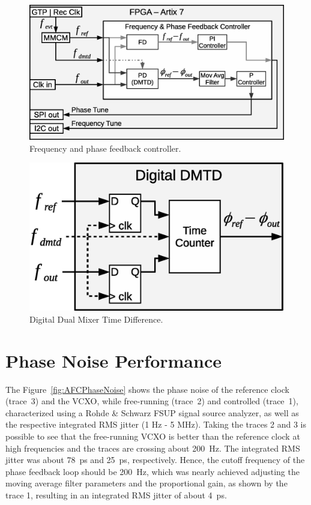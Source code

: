 \documentclass[a4paper,
               biblatex,      %
               ]{jacow}
\begin{document}
\begin{figure}[!htb]
   \centering
   \includegraphics*[width=0.9\columnwidth]{AFCFPGADMTD}
   \caption{Frequency and phase feedback controller.}
   \label{fig:AFCFPGADMTD}
\end{figure}

\begin{figure}[!htb]
   \centering
   \includegraphics*[width=0.8\columnwidth]{DigitalDMTD}
   \caption{Digital Dual Mixer Time Difference.}
   \label{fig:DigitalDMTD}
\end{figure}

\section{Phase Noise Performance}

The Figure~\ref{fig:AFCPhaseNoise} shows the phase noise of the reference clock (trace~3) and the VCXO, while free-running (trace~2) and controlled (trace~1), characterized using a Rohde \& Schwarz FSUP signal source analyzer, as well as the respective integrated RMS jitter (1 Hz - 5 MHz). Taking the traces 2 and 3 is possible to see that the free-running VCXO is better than the reference clock at high frequencies and the traces are crossing about 200~Hz. The integrated RMS jitter was about 78~ps and 25~ps, respectively. Hence, the cutoff frequency of the phase feedback loop should be 200~Hz, which was nearly achieved adjusting the moving average filter parameters and the proportional gain, as shown by the trace 1, resulting in an integrated RMS jitter of about 4~ps.
\end{document}
